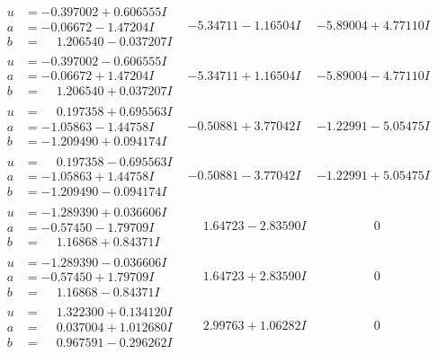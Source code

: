 \documentclass[1p]{elsarticle_modified}
\theoremstyle{definition}
\begin{document}
$$\begin{array}{c|c|c}
\begin{aligned}
u &= -0.397002 + 0.606555 I \\
a &= -0.06672 - 1.47204 I \\
b &= \phantom{-}1.206540 - 0.037207 I\end{aligned}
 & -5.34711 - 1.16504 I & -5.89004 + 4.77110 I \\ \hline\begin{aligned}
u &= -0.397002 - 0.606555 I \\
a &= -0.06672 + 1.47204 I \\
b &= \phantom{-}1.206540 + 0.037207 I\end{aligned}
 & -5.34711 + 1.16504 I & -5.89004 - 4.77110 I \\ \hline\begin{aligned}
u &= \phantom{-}0.197358 + 0.695563 I \\
a &= -1.05863 - 1.44758 I \\
b &= -1.209490 + 0.094174 I\end{aligned}
 & -0.50881 + 3.77042 I & -1.22991 - 5.05475 I \\ \hline\begin{aligned}
u &= \phantom{-}0.197358 - 0.695563 I \\
a &= -1.05863 + 1.44758 I \\
b &= -1.209490 - 0.094174 I\end{aligned}
 & -0.50881 - 3.77042 I & -1.22991 + 5.05475 I \\ \hline\begin{aligned}
u &= -1.289390 + 0.036606 I \\
a &= -0.57450 - 1.79709 I \\
b &= \phantom{-}1.16868 + 0.84371 I\end{aligned}
 & \phantom{-}1.64723 - 2.83590 I & \phantom{-0.000000 } 0 \\ \hline\begin{aligned}
u &= -1.289390 - 0.036606 I \\
a &= -0.57450 + 1.79709 I \\
b &= \phantom{-}1.16868 - 0.84371 I\end{aligned}
 & \phantom{-}1.64723 + 2.83590 I & \phantom{-0.000000 } 0 \\ \hline\begin{aligned}
u &= \phantom{-}1.322300 + 0.134120 I \\
a &= \phantom{-}0.037004 + 1.012680 I \\
b &= \phantom{-}0.967591 - 0.296262 I\end{aligned}
 & \phantom{-}2.99763 + 1.06282 I & \phantom{-0.000000 } 0 \\ \hline\begin{aligned}

\end{aligned}
\end{array}$$
\end{document}
